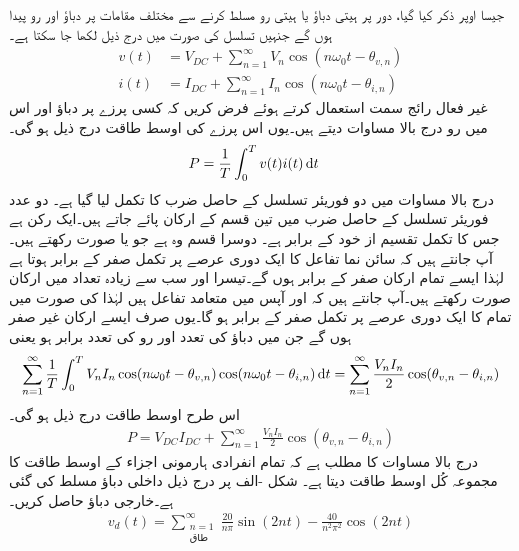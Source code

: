 جیسا اوپر ذکر کیا گیا، دور پر ہیتی  دباؤ یا ہیتی رو مسلط کرنے سے مختلف مقامات پر دباؤ اور رو پیدا ہوں گے جنہیں تسلسل کی صورت میں درج ذیل لکھا جا سکتا ہے۔ 
\begin{align}
v(t)&=V_{DC}+\sum_{n=1}^{\infty} V_n \cos (n\omega_0 t-\theta_{v,n})\\
i(t)&=I_{DC}+\sum_{n=1}^{\infty} I_n \cos (n\omega_0 t-\theta_{i,n})
\end{align}
غیر فعال رائج سمت استعمال کرتے ہوئے فرض کریں کہ کسی پرزے پر دباؤ اور اس میں رو درج بالا مساوات دیتے ہیں۔یوں اس پرزے کی اوسط طاقت درج ذیل ہو گی۔
\begin{align}\label{مساوات_فوریئر_طاقت_الف}
P&=\frac{1}{T}\int_0^T v(t)i(t) \dif t
\end{align}
درج بالا مساوات میں دو فوریئر تسلسل کے حاصل ضرب کا تکمل لیا گیا ہے۔ دو عدد فوریئر تسلسل کے حاصل ضرب  میں تین قسم کے ارکان پائے جاتے ہیں۔ایک رکن  ہے جس کا تکمل تقسیم  از خود  کے برابر ہے۔ دوسرا قسم وہ ہے جو  یا  صورت رکھتے ہیں۔ آپ جانتے ہیں کہ سائن نما تفاعل کا ایک دوری عرصے پر تکمل صفر کے برابر ہوتا ہے لہٰذا ایسے تمام ارکان صفر کے برابر ہوں گے۔تیسرا اور سب سے زیادہ تعداد میں  ارکان  صورت رکھتے ہیں۔آپ جانتے ہیں کہ  اور  آپس میں متعامد تفاعل ہیں لہٰذا  کی صورت میں تمام 
  کا ایک دوری عرصے پر تکمل صفر کے برابر ہو گا۔یوں صرف ایسے ارکان غیر صفر ہوں گے جن میں دباؤ کی تعدد  اور رو کی تعدد برابر ہو یعنی
\begin{align*}
\sum_{n=1}^{\infty} \frac{1}{T}\int_0^T V_n I_n \cos(n\omega_0 t-\theta_{v,n})\cos(n\omega_0 t-\theta_{i,n}) \dif t=\sum_{n=1}^{\infty} \frac{V_n I_n}{2} \cos(\theta_{v,n}-\theta_{i,n})
\end{align*}
اس طرح اوسط طاقت درج ذیل ہو گی۔
\begin{align}
P=V_{DC}I_{DC}+\sum_{n=1}^{\infty}\frac{ V_n I_n}{2} \cos(\theta_{v,n}-\theta_{i,n})
\end{align}
درج بالا مساوات کا مطلب ہے کہ تمام انفرادی ہارمونی اجزاء کے اوسط طاقت کا مجموعہ کُل اوسط طاقت دیتا ہے۔
شکل -الف پر درج ذیل داخلی دباؤ  مسلط کی گئی ہے۔خارجی دباؤ  حاصل کریں۔
\begin{align*}
v_d(t)=\sum_{\substack{n=1 \\ \text{طاق}}}^{\infty} \frac{20}{n\pi}\sin (2nt)-\frac{40}{n^2\pi^2}\cos(2nt)
\end{align*}
